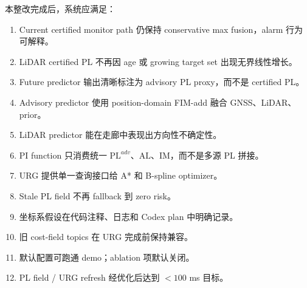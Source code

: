 \documentclass[11pt,a4paper]{article}
\newcommand{\PL}{\mathrm{PL}}
\newcommand{\AL}{\mathrm{AL}}
\newcommand{\IM}{\mathrm{IM}}
\begin{document}
本整改完成后，系统应满足：
\begin{enumerate}
\item Current certified monitor path 仍保持 conservative max fusion，alarm 行为可解释。
\item LiDAR certified PL 不再因 age 或 growing target set 出现无界线性增长。
\item Future predictor 输出清晰标注为 advisory PL proxy，而不是 certified PL。
\item Advisory predictor 使用 position-domain FIM-add 融合 GNSS、LiDAR、prior。
\item LiDAR predictor 能在走廊中表现出方向性不确定性。
\item PI function 只消费统一 $\PL^{adv}$、$\AL$、$\IM$，而不是多源 PL 拼接。
\item URG 提供单一查询接口给 A* 和 B-spline optimizer。
\item Stale PL field 不再 fallback 到 zero risk。
\item 坐标系假设在代码注释、日志和 Codex plan 中明确记录。
\item 旧 cost-field topics 在 URG 完成前保持兼容。
\item 默认配置可跑通 demo；ablation 项默认关闭。
\item PL field / URG refresh 经优化后达到 $<100$ ms 目标。
\end{enumerate}

\vspace{1em}
\begin{center}
\Large
{}
\end{center}
\end{document}
